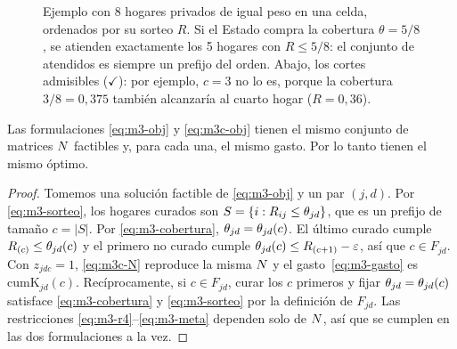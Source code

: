 \begin{figure}[ht]
\centering
{}
\caption{Ejemplo con 8 hogares privados de igual peso en una celda, ordenados por
su sorteo $R$. Si el Estado compra la cobertura $\theta=5/8$, se atienden exactamente
los 5 hogares con $R\le 5/8$: el conjunto de atendidos es siempre un prefijo del
orden. Abajo, los cortes admisibles ($\checkmark$): por ejemplo, $c=3$ no lo es,
porque la cobertura $3/8=0{,}375$ también alcanzaría al cuarto hogar
($R=0{,}36$).}
\label{fig:cortes}
\end{figure}

\begin{proposition}\label{prop:cortes}
Las formulaciones \eqref{eq:m3-obj} y \eqref{eq:m3c-obj} tienen el mismo
conjunto de matrices $N$ factibles y, para cada una, el mismo gasto. Por lo
tanto tienen el mismo óptimo.
\end{proposition}
\begin{proof}
Tomemos una solución factible de \eqref{eq:m3-obj} y un par $(j,d)$. Por
\eqref{eq:m3-sorteo}, los hogares curados son $S=\{i:R_{ij}\le\theta_{jd}\}$, que
es un prefijo de tamaño $c=|S|$. Por \eqref{eq:m3-cobertura},
$\theta_{jd}=\theta_{jd}(c)$. El último curado cumple $R_{(c)}\le\theta_{jd}(c)$ y el
primero no curado cumple $\theta_{jd}(c)\le R_{(c+1)}-\varepsilon$, así que
$c\in F_{jd}$. Con $z_{jdc}=1$, \eqref{eq:m3c-N} reproduce la misma $N$ y el
gasto~\eqref{eq:m3-gasto} es $\mathrm{cumK}_{jd}(c)$. Recíprocamente, si
$c\in F_{jd}$, curar los $c$ primeros y fijar $\theta_{jd}=\theta_{jd}(c)$ satisface
\eqref{eq:m3-cobertura} y \eqref{eq:m3-sorteo} por la definición de $F_{jd}$.
Las restricciones \eqref{eq:m3-r4}--\eqref{eq:m3-meta} dependen solo de $N$,
así que se cumplen en las dos formulaciones a la vez.
\end{proof}

